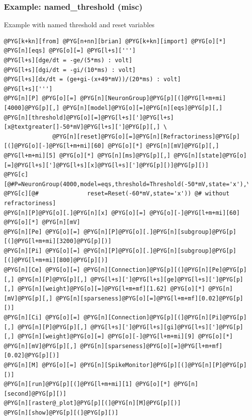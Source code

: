 \documentclass[letterpaper,10pt,english]{manual}
\begin{document}
\resetcurrentobjects
\hypertarget{--doc-examples-misc_named_threshold}{}

\hypertarget{index-56}{}\subsubsection{Example: named\_threshold (misc)}

Example with named threshold and reset variables

\begin{Verbatim}[commandchars=@\[\]]
@PYG[k+kn][from] @PYG[n+nn][brian] @PYG[k+kn][import] @PYG[o][*]
@PYG[n][eqs] @PYG[o][=] @PYG[l+s][''']
@PYG[l+s][dge/dt = -ge/(5*ms) : volt]
@PYG[l+s][dgi/dt = -gi/(10*ms) : volt]
@PYG[l+s][dx/dt = (ge+gi-(x+49*mV))/(20*ms) : volt]
@PYG[l+s][''']
@PYG[n][P] @PYG[o][=] @PYG[n][NeuronGroup]@PYG[p][(]@PYG[l+m+mi][4000]@PYG[p][,] @PYG[n][model]@PYG[o][=]@PYG[n][eqs]@PYG[p][,] @PYG[n][threshold]@PYG[o][=]@PYG[l+s][']@PYG[l+s][x@textgreater[]-50*mV]@PYG[l+s][']@PYG[p][,] \
              @PYG[n][reset]@PYG[o][=]@PYG[n][Refractoriness]@PYG[p][(]@PYG[o][-]@PYG[l+m+mi][60] @PYG[o][*] @PYG[n][mV]@PYG[p][,] @PYG[l+m+mi][5] @PYG[o][*] @PYG[n][ms]@PYG[p][,] @PYG[n][state]@PYG[o][=]@PYG[l+s][']@PYG[l+s][x]@PYG[l+s][']@PYG[p][)]@PYG[p][)]
@PYG[c][@#P=NeuronGroup(4000,model=eqs,threshold=Threshold(-50*mV,state='x'),\]
@PYG[c][@#              reset=Reset(-60*mV,state='x')) @# without refractoriness]
@PYG[n][P]@PYG[o][.]@PYG[n][x] @PYG[o][=] @PYG[o][-]@PYG[l+m+mi][60] @PYG[o][*] @PYG[n][mV]
@PYG[n][Pe] @PYG[o][=] @PYG[n][P]@PYG[o][.]@PYG[n][subgroup]@PYG[p][(]@PYG[l+m+mi][3200]@PYG[p][)]
@PYG[n][Pi] @PYG[o][=] @PYG[n][P]@PYG[o][.]@PYG[n][subgroup]@PYG[p][(]@PYG[l+m+mi][800]@PYG[p][)]
@PYG[n][Ce] @PYG[o][=] @PYG[n][Connection]@PYG[p][(]@PYG[n][Pe]@PYG[p][,] @PYG[n][P]@PYG[p][,] @PYG[l+s][']@PYG[l+s][ge]@PYG[l+s][']@PYG[p][,] @PYG[n][weight]@PYG[o][=]@PYG[l+m+mf][1.62] @PYG[o][*] @PYG[n][mV]@PYG[p][,] @PYG[n][sparseness]@PYG[o][=]@PYG[l+m+mf][0.02]@PYG[p][)]
@PYG[n][Ci] @PYG[o][=] @PYG[n][Connection]@PYG[p][(]@PYG[n][Pi]@PYG[p][,] @PYG[n][P]@PYG[p][,] @PYG[l+s][']@PYG[l+s][gi]@PYG[l+s][']@PYG[p][,] @PYG[n][weight]@PYG[o][=] @PYG[o][-]@PYG[l+m+mi][9] @PYG[o][*] @PYG[n][mV]@PYG[p][,] @PYG[n][sparseness]@PYG[o][=]@PYG[l+m+mf][0.02]@PYG[p][)]
@PYG[n][M] @PYG[o][=] @PYG[n][SpikeMonitor]@PYG[p][(]@PYG[n][P]@PYG[p][)]
@PYG[n][run]@PYG[p][(]@PYG[l+m+mi][1] @PYG[o][*] @PYG[n][second]@PYG[p][)]
@PYG[n][raster@_plot]@PYG[p][(]@PYG[n][M]@PYG[p][)]
@PYG[n][show]@PYG[p][(]@PYG[p][)]
\end{Verbatim}
\end{document}
